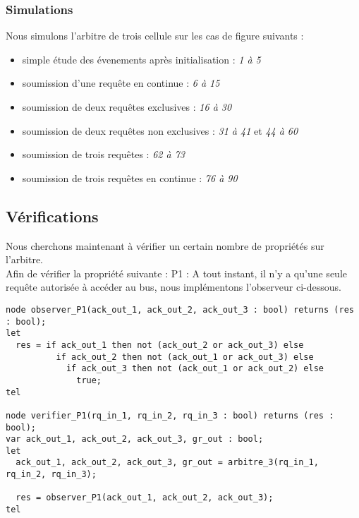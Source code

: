 \documentclass[a4paper]{article}
\begin{document}
\subsubsection{Simulations}
Nous simulons l'arbitre de trois cellule sur les cas de figure suivants : 
\begin{itemize}
\item simple étude des évenements après initialisation : \emph{1 à 5}
\item soumission d'une requête en continue : \emph{6 à 15}
\item soumission de deux requêtes exclusives : \emph{16 à 30}
\item soumission de deux requêtes non exclusives : \emph{31 à 41} et \emph{44 à 60}
\item soumission de trois requêtes : \emph{62 à 73}
\item soumission de trois requêtes en continue : \emph{76 à 90}
\end{itemize}

\vspace{10mm}



\subsection{Vérifications}

Nous cherchons maintenant à vérifier un certain nombre de propriétés sur l'arbitre.\\

Afin de vérifier la propriété suivante : P1 : A tout instant, il n'y a qu'une seule
requête autorisée à accéder au bus, nous implémentons l'observeur ci-dessous.

\begin{verbatim}
node observer_P1(ack_out_1, ack_out_2, ack_out_3 : bool) returns (res : bool);
let
  res = if ack_out_1 then not (ack_out_2 or ack_out_3) else
          if ack_out_2 then not (ack_out_1 or ack_out_3) else
            if ack_out_3 then not (ack_out_1 or ack_out_2) else
              true;
tel

node verifier_P1(rq_in_1, rq_in_2, rq_in_3 : bool) returns (res : bool);
var ack_out_1, ack_out_2, ack_out_3, gr_out : bool;
let
  ack_out_1, ack_out_2, ack_out_3, gr_out = arbitre_3(rq_in_1, rq_in_2, rq_in_3);

  res = observer_P1(ack_out_1, ack_out_2, ack_out_3);
tel
\end{verbatim}
\end{document}

